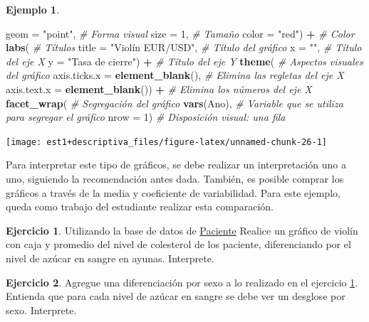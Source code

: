 \documentclass[
  11pt,
]{book}
\newenvironment{Shaded}{\begin{snugshade}}{\end{snugshade}}
\newcommand{\AttributeTok}[1]{\textcolor[rgb]{0.13,0.29,0.53}{#1}}
\newcommand{\CommentTok}[1]{\textcolor[rgb]{0.56,0.35,0.01}{\textit{#1}}}
\newcommand{\DecValTok}[1]{\textcolor[rgb]{0.00,0.00,0.81}{#1}}
\newcommand{\FunctionTok}[1]{\textcolor[rgb]{0.13,0.29,0.53}{\textbf{#1}}}
\newcommand{\NormalTok}[1]{#1}
\newcommand{\SpecialCharTok}[1]{\textcolor[rgb]{0.81,0.36,0.00}{\textbf{#1}}}
\newcommand{\StringTok}[1]{\textcolor[rgb]{0.31,0.60,0.02}{#1}}
\theoremstyle{definition}
\theoremstyle{definition}
\newtheorem{example}{Ejemplo}[chapter]
\theoremstyle{definition}
\newtheorem{exercise}{Ejercicio}[chapter]
\theoremstyle{definition}
\theoremstyle{remark}
\begin{document}
\begin{example}
\begin{Shaded}
\begin{Highlighting}[]
    \AttributeTok{geom =} \StringTok{"point"}\NormalTok{, }\CommentTok{\# Forma visual}
    \AttributeTok{size =} \DecValTok{1}\NormalTok{, }\CommentTok{\# Tamaño}
    \AttributeTok{color =} \StringTok{"red"}\NormalTok{) }\SpecialCharTok{+} \CommentTok{\# Color}
  \FunctionTok{labs}\NormalTok{( }\CommentTok{\# Títulos}
    \AttributeTok{title =} \StringTok{"Violín EUR/USD"}\NormalTok{, }\CommentTok{\# Título del gráfico}
    \AttributeTok{x =} \StringTok{""}\NormalTok{, }\CommentTok{\# Título del eje X}
    \AttributeTok{y =} \StringTok{"Tasa de cierre"}\NormalTok{) }\SpecialCharTok{+} \CommentTok{\# Título del eje Y}
  \FunctionTok{theme}\NormalTok{( }\CommentTok{\# Aspectos visuales del gráfico}
    \AttributeTok{axis.ticks.x =} \FunctionTok{element\_blank}\NormalTok{(), }\CommentTok{\# Elimina las regletas del eje X}
    \AttributeTok{axis.text.x =} \FunctionTok{element\_blank}\NormalTok{()) }\SpecialCharTok{+} \CommentTok{\# Elimina los números del eje X}
  \FunctionTok{facet\_wrap}\NormalTok{( }\CommentTok{\# Segregación del gráfico}
    \FunctionTok{vars}\NormalTok{(Ano), }\CommentTok{\# Variable que se utiliza para segregar el gráfico}
    \AttributeTok{nrow =} \DecValTok{1}\NormalTok{) }\CommentTok{\# Disposición visual: una fila}
\end{Highlighting}
\end{Shaded}

\begin{center}\texttt{[image: est1+descriptiva\_files/figure-latex/unnamed-chunk-26-1]} \end{center}

Para interpretar este tipo de gráficos, se debe realizar un interpretación uno a uno, siguiendo la recomendación antes dada. También, es posible comprar los gráficos a través de la media y coeficiente de variabilidad. Para este ejemplo, queda como trabajo del estudiante realizar esta comparación.
\end{example}

\begin{exercise}
\protect\hypertarget{exr:violin-colesterol-azucar}{}\label{exr:violin-colesterol-azucar}Utilizando la base de datos de \hyperref[Pacientes]{Paciente} Realice un gráfico de violín con caja y promedio del nivel de colesterol de los paciente, diferenciando por el nivel de azúcar en sangre en ayunas. Interprete.
\end{exercise}

\begin{exercise}
Agregue una diferenciación por sexo a lo realizado en el ejercicio \ref{exr:violin-colesterol-azucar}. Entienda que para cada nivel de azúcar en sangre se debe ver un desglose por sexo. Interprete.
\end{exercise}
\end{document}
